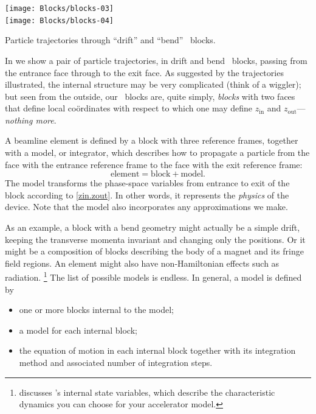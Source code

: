 \begin{marginfigure}[\baselineskip]\forceversofloat
  \centering
  \texttt{[image: Blocks/blocks-03]}\\[1.5ex]
  \texttt{[image: Blocks/blocks-04]}
  \caption{Particle trajectories through ``drift'' and ``bend''
           \LEGO\ blocks.}
  \label{fig:LEGO.maps}
\end{marginfigure}
In  we show a pair of particle trajectories,
in drift and bend \LEGO\ blocks, passing from the entrance face
through to the exit face. As suggested by the trajectories
illustrated, the internal structure may be very complicated
(think of a wiggler); but seen from the outside, our
\LEGO\ blocks are, quite simply, \emph{blocks} with two faces
that define local co\"ordinates with respect to which one may
define $z_\text{in}$ and $z_\text{out}$---\emph{nothing more}.

%
A beamline element is defined by a block with three reference frames,
together with a model, or integrator, which describes how to propagate
a particle from the face with the entrance reference frame to the face
with the exit reference frame:
\begin{equation*}
  \text{element} = \text{block} + \text{model}.
\end{equation*}
The model transforms the phase-space variables from entrance to
exit of the block according to \eqref{zin.zout}. In other words,
it represents the \emph{physics} of the device. Note that the model
also incorporates any approximations we make.

%
As an example, a block with a bend geometry might actually be a
simple drift, keeping the transverse momenta invariant and
changing only the positions. Or it might be a composition of
blocks describing the body of a magnet and its fringe field
regions. An element might also have non-Hamiltonian effects
such as radiation.%
\footnote{ discusses \PTC's internal state variables,
which describe the characteristic dynamics you can choose for your
accelerator model.}
The list of possible models is endless. In general, a model is
defined by
\begin{itemize}
  \item one or more blocks internal to the model;
  \item a model for each internal block;
  \item the equation of motion in each internal block together with
its integration method and associated number of integration steps.
\end{itemize}

